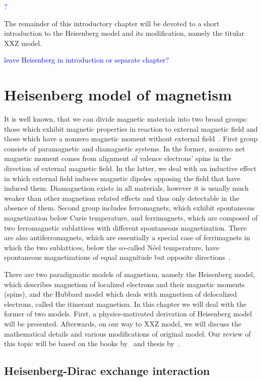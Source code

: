 \textcolor{blue}{?}

The remainder of this introductory chapter will be devoted to a short introduction
to the Heisenberg model and its modification, namely the titular XXZ model.

\textcolor{blue}{leave Heisenberg in introduction or separate chapter?}

\section{Heisenberg model of magnetism\label{sec:XXZ}}
    It is well known, that we can divide magnetic materials into two broad groups: those which
exhibit magnetic properties in reaction to external magnetic field and those which have a nonzero
magnetic moment without external field~\autocite{spalek2015}. First group consists of paramagnetic
and diamagnetic systems. In the former, nonzero net magnetic moment comes from alignment of
valence electrons' spins in the direction of external magnetic field. In the latter, we deal with
 an inductive effect in which external field induces magnetic dipoles opposing the field that have
induced them. Diamagnetism exists in all materials, however it is usually much weaker than other magnetism related
effects and thus only detectable in the absence of them. Second group includes ferromagnets, which
exhibit spontaneous magnetization below Curie temperature, and ferrimagnets, which are 
composed of two ferromagnetic sublattices with different spontaneous magnetization. There
are also antiferromagnets, which are essentially a special case of ferrimagnets in which the two sublattices,
below the so-called N{\'e}el temperature, have spontaneous magnetizations of equal magnitude
but opposite directions~\autocite{nolting2018theoretical}.

There are two paradigmatic models of magnetism, namely the Heisenberg model, which describes magnetism
of localized electrons and their magnetic moments (spins), and the Hubbard model which deals with
magnetism of delocalized electrons, called the itinerant magnetism. 
In this chapter we will deal with the former of two models.
First, a physics-motivated derivation of Heisenberg model will be presented. Afterwards,
on our way to XXZ model, we will discuss the mathematical details and various modifications
of original model. Our review of this topic will be based on the books by~\textcite{spalek2015} and 
thesis by~\textcite{Ng2011HeisenbergM}.

\subsection{Heisenberg-Dirac exchange interaction}
